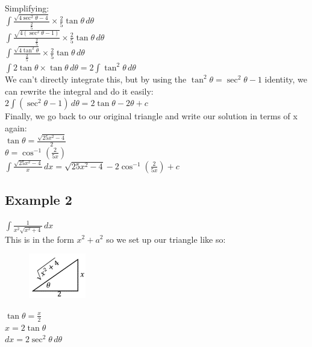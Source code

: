 \documentclass[../main.tex]{subfiles}
\begin{document}
    Simplifying:\\
    \(\int \frac{\sqrt{4\sec^2{\theta}-4}}{\frac{2}{5}}\times \frac{2}{5}\tan{\theta}\,d\theta\)\\

    \(\int \frac{\sqrt{4(\sec^2{\theta}-1)}}{\frac{2}{5}}\times \frac{2}{5}\tan{\theta}\,d\theta\)\\

    \(\int \frac{\sqrt{4\tan^2{\theta}}}{\frac{2}{5}}\times \frac{2}{5}\tan{\theta}\,d\theta\)\\

    \(\int 2\tan{\theta}\times \tan{\theta}\,d\theta=2\int \tan^2{\theta}\,d\theta\)\\

    We can’t directly integrate this, but by using the \(\tan^2{\theta}=\sec^2{\theta}-1\) identity, we can rewrite the integral and do it easily:\\
    \(2\int (\sec^2{\theta}-1)\,d\theta=2\tan{\theta}-2\theta+c\)\\

    Finally, we go back to our original triangle and write our solution in terms of x again:\\
    \(\tan{\theta}=\frac{\sqrt{25x^2-4}}{2}\)\\

    \(\theta=\cos^{-1}{(\frac{2}{5x})}\)\\

    \(\int \frac{\sqrt{25x^2-4}}{x}\,dx=\sqrt{25x^2-4}-2\cos^{-1}{(\frac{2}{5x})}+c\)\\

    \subsection*{Example 2}
    \(\int \frac{1}{x^2\sqrt{x^2+4}}\,dx\)\\

    This is in the form \(x^2+a^2\) so we set up our triangle like so:\\
    \begin{figure}[h]
        \centering
        \includegraphics{images/trigsub5.png}
    \end{figure}

    \(\tan{\theta}=\frac{x}{2}\)\\
    \(x=2\tan{\theta}\)\\
    \(dx=2\sec^2{\theta}\,d\theta\)\\
\end{document}
